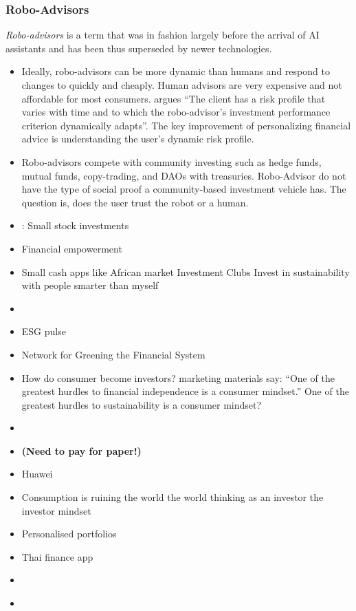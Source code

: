 \documentclass[
  letterpaper,
  DIV=11,
  numbers=noendperiod]{scrartcl}
\providecommand{\tightlist}{%
  \setlength{\itemsep}{0pt}\setlength{\parskip}{0pt}}\usepackage{longtable,booktabs,array}
\begin{document}
\subsubsection{Robo-Advisors}\label{robo-advisors}

\emph{Robo-advisors} is a term that was in fashion largely before the
arrival of AI assistants and has been thus superseded by newer
technologies.

\begin{itemize}
\tightlist
\item
  Ideally, robo-advisors can be more dynamic than humans and respond to
  changes to quickly and cheaply. Human advisors are very expensive and
  not affordable for most consumers.
  \citet{capponiPersonalizedRoboAdvisingInteractive2019} argues ``The
  client has a risk profile that varies with time and to which the
  robo-advisor's investment performance criterion dynamically adapts''.
  The key improvement of personalizing financial advice is understanding
  the user's dynamic risk profile.
\item
  Robo-advisors compete with community investing such as hedge funds,
  mutual funds, copy-trading, and DAOs with treasuries. Robo-Advisor do
  not have the type of social proof a community-based investment vehicle
  has. The question is, does the user trust the robot or a human.
\item
  \citet{johnssenkeeziVeBeenInvited2022}: Small stock investments
\item
  Financial empowerment
\item
  Small cash apps like African market Investment Clubs Invest in
  sustainability with people smarter than myself
\item
  \citet{PhaseTwoInvesting}
\item
  \citet{qayyumrajanESGAnalyticsIntroduction2021} ESG pulse
\item
  \citet{NGFS} Network for Greening the Financial System
\item
  \citet{smartwealthHowBecomeInvestor2021} How do consumer become
  investors? marketing materials say: ``One of the greatest hurdles to
  financial independence is a consumer mindset.'' One of the greatest
  hurdles to sustainability is a consumer mindset?
\item
  \citet{outlawTurnYourCustomers2015}
\item
  \citet{malliarisUsingNeuralNetworks1996} \textbf{(Need to pay for
  paper!)}
\item
  \citet{CMBNewFuture} Huawei
\item
  Consumption is ruining the world the world thinking as an investor the
  investor mindset
\item
  \citet{Vise2023} Personalised portfolios
\item
  \citet{WalletAppsGoogle} Thai finance app
\item
  \citet{ThaiFintechAssociation}
\item
  \citet{renatocapeljMobileHedgeFund2021}
\end{itemize}
\end{document}
